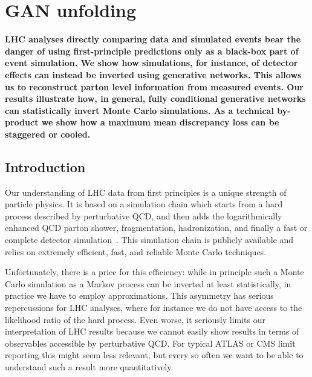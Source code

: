 %
%
%

\chapter{GAN unfolding}\label{chap:gan}
\enlargethispage{2ex}
\vspace*{-2pt}

\enlargethispage{2ex}

{\bf LHC analyses directly comparing data and simulated events bear the 
danger of using first-principle predictions only as a black-box part of event simulation. We show how simulations, for instance, of detector effects can instead be inverted using generative networks. This allows us to reconstruct parton level information from measured events. Our results illustrate how, in general, fully conditional generative networks can statistically invert Monte Carlo simulations. As a technical by-product we show how a maximum mean discrepancy loss can be staggered or cooled.}
  
\section{Introduction}
\label{sec:ganintro}

Our understanding of LHC data from first principles is a unique
strength of particle physics. It is based on a simulation chain which
starts from a hard process described by perturbative QCD, and then
adds the logarithmically enhanced QCD parton shower, fragmentation,
hadronization, and finally a fast or complete detector
simulation~\cite{black_book}. This simulation chain is publicly
available and relies on extremely efficient, fast, and reliable Monte
Carlo techniques.

Unfortunately, there is a price for this efficiency: while in
principle such a Monte Carlo simulation as a Markov process can be
inverted at least statistically, in practice we have to employ
approximations. This asymmetry has serious repercussions for LHC
analyses, where for instance we do not have access to the likelihood
ratio of the hard process. Even worse, it seriously limits our
interpretation of LHC results because we cannot easily show results in
terms of observables accessible by perturbative QCD. For typical ATLAS
or CMS limit reporting this might seem less relevant, but every so
often we want to be able to understand such a result more
quantitatively.

